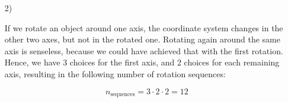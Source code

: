 \documentclass[a4paper,11pt]{article}
\begin{document}
\begin {enumerate}
\begin{enumerate}
            \begin{enumerate}
                \item $(90\degree, -20\degree, 30\degree)$ in $ZY'X''$ means a $90\degree$ rotation around the z-axis, a rotation by $-20\degree$ around the newly defined y-axis and a $30\degree$ rotation around the new frame's x-axis.
                \item $(-15\degree, 100\degree, 12\degree)$ in $XZ'Y''$ means a $-15\degree$ rotation around the x-axis, a rotation by $100\degree$ around the newly defined z-axis and a $12\degree$ rotation around the new frame's y-axis.
                \item $(30\degree, 10\degree, -50\degree)$ in $YX'Y''$ means a $30\degree$ rotation around the y-axis, a rotation by $10\degree$ around the newly defined x-axis and a $-50\degree$ rotation around the new frame's y-axis.
            \end{enumerate}

        \item[2)]

            If we rotate an object around one axis, the coordinate system
            changes in the other two axes, but not in the rotated one. Rotating
            again around the same axis is senseless, because we could have
            achieved that with the first rotation. Hence, we have 3 choices for
            the first axis, and 2 choices for each remaining axis, resulting in
            the following number of rotation sequences:

            $$n_{\text{sequences}} = 3 \cdot 2 \cdot 2 = 12$$

    \end{enumerate}

\end {enumerate}
\end{document}
